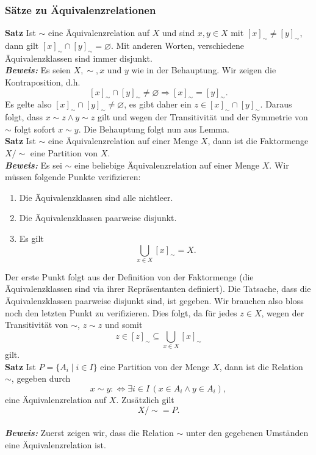 \subsubsection{Sätze zu Äquivalenzrelationen}%
\label{ssub:sätze_zu_äquivalenzrelationen}
\textbf{Satz }
Ist $\sim $ eine Äquivalenzrelation auf $X$ und sind $x,y\in X$ mit $[x]_\sim\neq[y]_\sim$, dann gilt $[x]_\sim\cap[y]_\sim=\varnothing$.
Mit anderen Worten, verschiedene Äquivalenzklassen sind immer disjunkt.\\
\textbf{\textit{Beweis: }}
Es seien $X,\sim,x$ und $y$ wie in der Behauptung. Wir zeigen die Kontraposition, d.h.
\[
	[x]_\sim\cap[y]_\sim\neq\varnothing\Rightarrow [x]_\sim=[y]_\sim.
\]
Es gelte also $[x]_\sim\cap[y]_\sim\neq\varnothing$, es gibt daher ein $z\in [x]_\sim\cap[y]_\sim$. Daraus folgt,
dass $x\sim z\land y\sim z$ gilt und wegen der Transitivität und der Symmetrie von $\sim$ folgt sofort $x\sim y$.
Die Behauptung folgt nun aus Lemma.\\
\textbf{Satz }
Ist $\sim$ eine Äquivalenzrelation auf einer Menge $X$, dann ist die Faktormenge $X/\sim$ eine Partition von $X$.\\
\textbf{\textit{Beweis: }}
Es sei $\sim$ eine beliebige Äquivalenzrelation auf einer Menge $X$. Wir müssen folgende Punkte verifizieren:
\begin{enumerate}
	\item\label{a} Die Äquivalenzklassen sind alle nichtleer.
	\item\label{2} Die Äquivalenzklassen paarweise disjunkt.
	\item\label{3} Es gilt
	      \[
		      \bigcup_{x\in X}[x]_{\sim}=X.
	      \]
\end{enumerate}
Der erste Punkt folgt aus der Definition von der Faktormenge (die Äquivalenzklassen sind via ihrer Repräsentanten definiert). Die Tatsache, dass die Äquivalenzklassen paarweise disjunkt sind, ist gegeben. Wir brauchen also bloss noch den letzten Punkt zu verifizieren. Dies folgt, da für jedes $z\in X$, wegen der Transitivität von $\sim$, $z\sim z$ und somit
\[
	z\in[z]_\sim\subseteq\bigcup_{x\in X}[x]_\sim
\]
gilt.\\
\textbf{Satz }
Ist $P=\{A_i\mid i\in I\}$ eine Partition von der Menge $X$, dann ist die Relation $\sim$, gegeben durch
\[
	x\sim y:\Leftrightarrow \exists i\in I\,(x\in A_i\land y\in A_i),
\]
eine Äquivalenzrelation auf $X$. Zusätzlich gilt
\[
	X/\sim=P.
\]\\
\textbf{\textit{Beweis: }}
Zuerst zeigen wir, dass die Relation $\sim$ unter den gegebenen Umständen eine Äquivalenzrelation ist.
